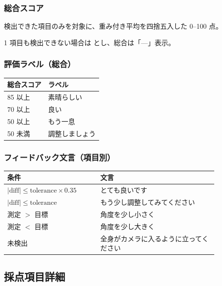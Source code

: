 \documentclass[a4paper,11pt]{ltjsarticle}
\begin{document}
\subsubsection{総合スコア}

検出できた項目のみを対象に、重み付き平均を四捨五入した 0--100 点。

1 項目も検出できない場合は  とし、総合は「---」表示。

\subsubsection{評価ラベル（総合）}

\begin{table}[h]
  \centering
  \begin{tabular}{@{}ll@{}}
    \toprule
    総合スコア & ラベル \\
    \midrule
    85 以上 & 素晴らしい \\
    70 以上 & 良い \\
    50 以上 & もう一息 \\
    50 未満 & 調整しましょう \\
    \bottomrule
  \end{tabular}
\end{table}

\subsubsection{フィードバック文言（項目別）}

\begin{table}[h]
  \centering
  \small
  \begin{tabular}{@{}p{0.38\linewidth}p{0.48\linewidth}@{}}
    \toprule
    条件 & 文言 \\
    \midrule
    $|\mathrm{diff}| \le \mathrm{tolerance} \times 0.35$ & とても良いです \\
    $|\mathrm{diff}| \le \mathrm{tolerance}$ & もう少し調整してみてください \\
    測定 $>$ 目標 & 角度を少し小さく \\
    測定 $<$ 目標 & 角度を少し大きく \\
    未検出 & 全身がカメラに入るように立ってください \\
    \bottomrule
  \end{tabular}
\end{table}

\subsection{採点項目詳細}
\end{document}
